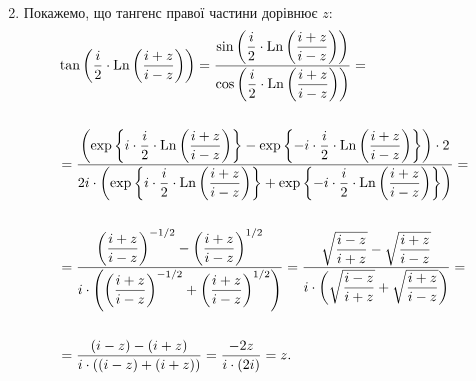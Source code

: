 \begin{solution}
\begin{enumerate}
\begin{align*}
        \end{align*}
        \item Покажемо, що тангенс правої частини дорівнює $z$:
        \begin{align*}
            & \tan \left( \dfrac i2 \cdot \operatorname{Ln} \left(\dfrac {i + z}{i - z}\right) \right) = \dfrac{\sin \left( \dfrac i2 \cdot \operatorname{Ln} \left(\dfrac {i + z}{i - z}\right) \right)}{\cos \left( \dfrac i2 \cdot \operatorname{Ln} \left(\dfrac {i + z}{i - z}\right) \right)} = \\
            \\
            &= \dfrac{\left(\exp\left\{ i\cdot \dfrac i2 \cdot \operatorname{Ln} \left(\dfrac {i + z}{i - z}\right) \right\} - \exp\left\{ -i \cdot \dfrac i2 \cdot \operatorname{Ln} \left(\dfrac {i + z}{i - z}\right) \right\}\right) \cdot 2}{2i \cdot \left(\exp\left\{ i\cdot \dfrac i2 \cdot \operatorname{Ln} \left(\dfrac {i + z}{i - z}\right) \right\} + \exp\left\{ -i\cdot \dfrac i2 \cdot \operatorname{Ln} \left(\dfrac {i + z}{i - z}\right) \right\}\right)} = \\
            \\
            &= \dfrac{\left(\dfrac {i + z}{i - z}\right)^{-1/2} - \left(\dfrac {i + z}{i - z}\right)^{1/2}}{i \cdot \left( \left(\dfrac {i + z}{i - z}\right)^{-1/2} + \left(\dfrac {i + z}{i - z}\right)^{1/2}\right)} = \dfrac{\sqrt{\dfrac {i - z}{i + z}} - \sqrt{\dfrac {i + z}{i - z}}}{i \cdot \left(\sqrt{\dfrac {i - z}{i + z}} + \sqrt{\dfrac {i + z}{i - z}}\right)} = \\
            \\
            &= \dfrac{(i - z) - (i + z)}{i \cdot ((i - z) + (i + z))} = \dfrac{-2 z}{i \cdot (2i)} = z.
        \end{align*}
    \end{enumerate}

\end{solution}
